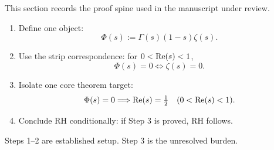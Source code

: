 This section records the proof spine used in the manuscript under review.

\begin{enumerate}
  \item Define one object:
  \[
  \Phi(s):=\Gamma(s)(1-s)\zeta(s).
  \]

  \item Use the strip correspondence:
  for $0<\operatorname{Re}(s)<1$,
  \[
  \Phi(s)=0\iff\zeta(s)=0.
  \]

  \item Isolate one core theorem target:
  \[
  \Phi(s)=0\Longrightarrow\operatorname{Re}(s)=\tfrac12
  \quad (0<\operatorname{Re}(s)<1).
  \]

  \item Conclude RH conditionally:
  if Step 3 is proved, RH follows.
\end{enumerate}

\noindent
Steps 1--2 are established setup.
Step 3 is the unresolved burden.
